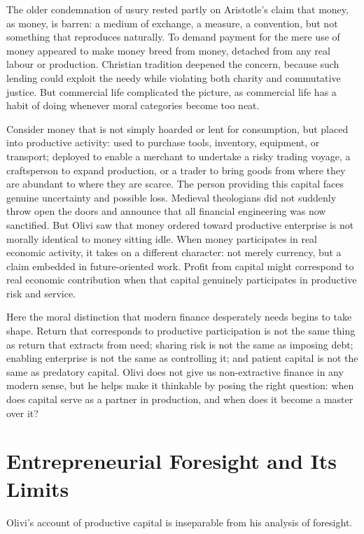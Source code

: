 \documentclass[11pt,a4paper,oneside]{book}
\begin{document}
The older condemnation of usury rested partly on Aristotle's claim that money, as money, is barren: a medium of exchange, a measure, a convention, but not something that reproduces naturally. To demand payment for the mere use of money appeared to make money breed from money, detached from any real labour or production. Christian tradition deepened the concern, because such lending could exploit the needy while violating both charity and commutative justice. But commercial life complicated the picture, as commercial life has a habit of doing whenever moral categories become too neat.

Consider money that is not simply hoarded or lent for consumption, but placed into productive activity: used to purchase tools, inventory, equipment, or transport; deployed to enable a merchant to undertake a risky trading voyage, a craftsperson to expand production, or a trader to bring goods from where they are abundant to where they are scarce. The person providing this capital faces genuine uncertainty and possible loss. Medieval theologians did not suddenly throw open the doors and announce that all financial engineering was now sanctified. But Olivi saw that money ordered toward productive enterprise is not morally identical to money sitting idle. When money participates in real economic activity, it takes on a different character: not merely currency, but a claim embedded in future-oriented work. Profit from capital might correspond to real economic contribution when that capital genuinely participates in productive risk and service.

Here the moral distinction that modern finance desperately needs begins to take shape. Return that corresponds to productive participation is not the same thing as return that extracts from need; sharing risk is not the same as imposing debt; enabling enterprise is not the same as controlling it; and patient capital is not the same as predatory capital. Olivi does not give us non-extractive finance in any modern sense, but he helps make it thinkable by posing the right question: when does capital serve as a partner in production, and when does it become a master over it?

\section*{Entrepreneurial Foresight and Its Limits}

Olivi's account of productive capital is inseparable from his analysis of foresight.
\end{document}
